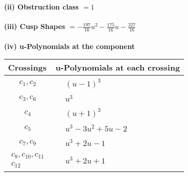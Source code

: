 \documentclass[1p]{elsarticle_modified}
\theoremstyle{definition}
\begin{document}
\flushleft \textbf{(ii) Obstruction class $= 1$}\\~\\
\flushleft \textbf{(iii) Cusp Shapes $= -\frac{197}{16} u^2-\frac{175}{16} u-\frac{327}{16}$}\\~\\
\newpage\renewcommand{\arraystretch}{1}
\flushleft \textbf{(iv) u-Polynomials at the component}\newline \\
\begin{tabular}{m{50pt}|m{274pt}}
Crossings & \hspace{64pt}u-Polynomials at each crossing \\
\hline $$\begin{aligned}c_{1},c_{2}\end{aligned}$$&$\begin{aligned}
&(u-1)^3
\end{aligned}$\\
\hline $$\begin{aligned}c_{3},c_{6}\end{aligned}$$&$\begin{aligned}
&u^3
\end{aligned}$\\
\hline $$\begin{aligned}c_{4}\end{aligned}$$&$\begin{aligned}
&(u+1)^3
\end{aligned}$\\
\hline $$\begin{aligned}c_{5}\end{aligned}$$&$\begin{aligned}
&u^3-3 u^2+5 u-2
\end{aligned}$\\
\hline $$\begin{aligned}c_{7},c_{9}\end{aligned}$$&$\begin{aligned}
&u^3+2 u-1
\end{aligned}$\\
\hline $$\begin{aligned}c_{8},c_{10},c_{11}\\c_{12}\end{aligned}$$&$\begin{aligned}
&u^3+2 u+1
\end{aligned}$\\
\hline
\end{tabular}\\~\\
\end{document}
